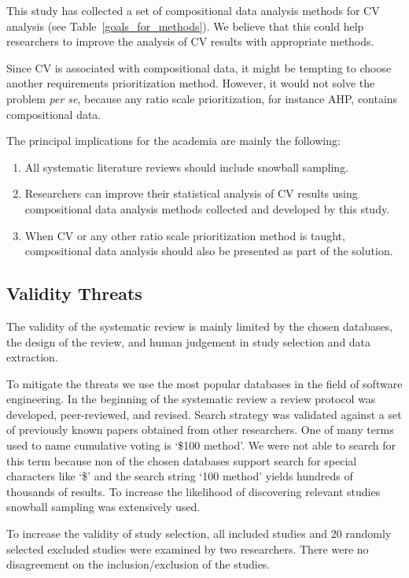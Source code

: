 This study has collected a set of compositional data analysis methods for CV analysis (see Table~\ref{goals_for_methods}). 
We believe that this could help researchers to improve the analysis of CV results with appropriate methods.

Since CV is associated with compositional data, it might be tempting to choose another requirements prioritization method. However, it would not solve the problem \emph{per se}, because any ratio scale prioritization, for instance AHP, contains compositional data.

The principal implications for the academia are mainly the following:

\begin{enumerate}
\item All systematic literature reviews should include snowball sampling.
\item Researchers can improve their statistical analysis of CV results using compositional data analysis methods collected and developed by this study.
\item When CV or any other ratio scale prioritization method is taught, compositional data analysis should also be presented as part of the solution.
\end{enumerate}

\subsection{Validity Threats}
The validity of the systematic review is mainly limited by the chosen databases, the design of the review, and human judgement in study selection and data extraction.

To mitigate the threats we use the most popular databases in the field of software engineering.
In the beginning of the systematic review a review protocol was developed, peer-reviewed, and revised.
Search strategy was validated against a set of previously known papers obtained from other researchers.
One of many terms used to name cumulative voting is `\$100 method'.
We were not able to search for this term because non of the chosen databases support search for special characters like `\$' and the search string `100 method' yields hundreds of thousands of results.
To increase the likelihood of discovering relevant studies snowball sampling was extensively used.

To increase the validity of study selection, all included studies and 20 randomly selected excluded studies were examined by two researchers.
There were no disagreement on the inclusion\slash exclusion of the studies.

